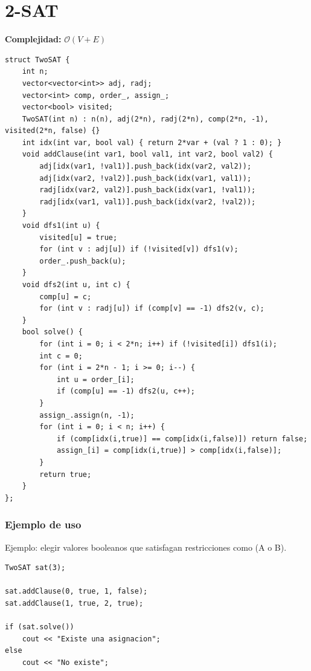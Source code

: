 \documentclass[10pt,twocolumn,letterpaper]{report}
\begin{document}
\section{2-SAT}
\textbf{Complejidad:} $\mathcal{O}(V + E)$
\begin{lstlisting}
struct TwoSAT {
    int n;
    vector<vector<int>> adj, radj;
    vector<int> comp, order_, assign_;
    vector<bool> visited;
    TwoSAT(int n) : n(n), adj(2*n), radj(2*n), comp(2*n, -1), visited(2*n, false) {}
    int idx(int var, bool val) { return 2*var + (val ? 1 : 0); }
    void addClause(int var1, bool val1, int var2, bool val2) {
        adj[idx(var1, !val1)].push_back(idx(var2, val2));
        adj[idx(var2, !val2)].push_back(idx(var1, val1));
        radj[idx(var2, val2)].push_back(idx(var1, !val1));
        radj[idx(var1, val1)].push_back(idx(var2, !val2));
    }
    void dfs1(int u) {
        visited[u] = true;
        for (int v : adj[u]) if (!visited[v]) dfs1(v);
        order_.push_back(u);
    }
    void dfs2(int u, int c) {
        comp[u] = c;
        for (int v : radj[u]) if (comp[v] == -1) dfs2(v, c);
    }
    bool solve() {
        for (int i = 0; i < 2*n; i++) if (!visited[i]) dfs1(i);
        int c = 0;
        for (int i = 2*n - 1; i >= 0; i--) {
            int u = order_[i];
            if (comp[u] == -1) dfs2(u, c++);
        }
        assign_.assign(n, -1);
        for (int i = 0; i < n; i++) {
            if (comp[idx(i,true)] == comp[idx(i,false)]) return false;
            assign_[i] = comp[idx(i,true)] > comp[idx(i,false)];
        }
        return true;
    }
};
\end{lstlisting}
\subsubsection*{Ejemplo de uso}
Ejemplo: elegir valores booleanos que satisfagan restricciones como (A o B).
\begin{lstlisting}
TwoSAT sat(3);

sat.addClause(0, true, 1, false);
sat.addClause(1, true, 2, true);

if (sat.solve())
    cout << "Existe una asignacion";
else
    cout << "No existe";
\end{lstlisting}


\end{document}

